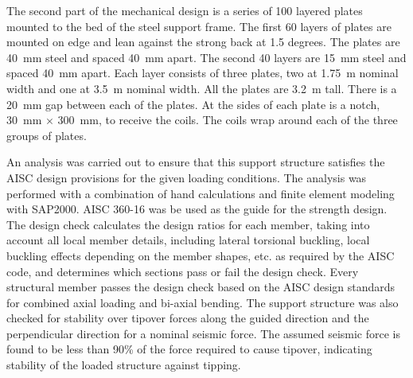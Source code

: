 The second part of the mechanical design is a series of \num{100} layered plates mounted to the bed of the steel support frame. The first \num{60} layers of plates are mounted on edge and lean against the strong back at \num{1.5} degrees. The plates are \SI{40}{\mm} steel and spaced \SI{40}{\mm} apart. The second \num{40} layers are \SI{15}{\mm} steel and spaced \SI{40}{\mm} apart. Each layer consists of three plates, two at \SI{1.75}{\m} nominal width and one at \SI{3.5}{\m} nominal width. All the plates are \SI{3.2}{\m} tall. There is a \SI{20}{\mm} gap between each of the plates. 
At the sides of each plate is a notch, \SI{30}{\mm} $\times$ \SI{300}{\mm}, to receive the coils. The coils wrap around each of the three groups of plates.


An analysis was carried out to ensure that this support structure satisfies the AISC design provisions for the given loading conditions.  The analysis was performed with a combination of hand calculations and finite element modeling with SAP2000.  AISC 360-16 was be used as the guide for the strength design.  The design check calculates the design ratios for each member, taking into account all local member details, including lateral torsional buckling, local buckling effects depending on the member shapes, etc. as required by the AISC code, and determines which sections pass or fail the design check. Every structural member passes the design check based on the AISC design standards for combined axial loading and bi-axial bending.  The support structure was also checked for stability over tipover forces along the guided direction and the perpendicular direction for a nominal seismic force.   The assumed seismic force is found to be less than 90\% of the force required to cause tipover, indicating stability of the loaded structure against tipping.   


